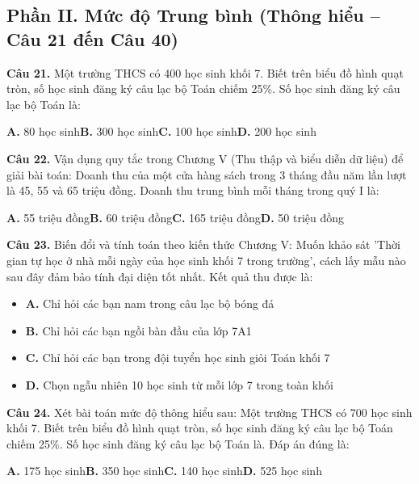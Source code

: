 \documentclass[11pt,a4paper]{article}
\begin{document}
\subsection*{\color{accent} Phần II. Mức độ Trung bình (Thông hiểu -- Câu 21 đến Câu 40)}
\textbf{\color{primary} Câu 21.} Một trường THCS có 400 học sinh khối 7. Biết trên biểu đồ hình quạt tròn, số học sinh đăng ký câu lạc bộ Toán chiếm 25\%. Số học sinh đăng ký câu lạc bộ Toán là:\par
\hspace*{1.5em}\textbf{A.} 80 học sinh\quad\quad \textbf{B.} 300 học sinh\quad\quad \textbf{C.} 100 học sinh\quad\quad \textbf{D.} 200 học sinh\par\vspace{2pt}
\textbf{\color{primary} Câu 22.} Vận dụng quy tắc trong Chương V (Thu thập và biểu diễn dữ liệu) để giải bài toán: Doanh thu của một cửa hàng sách trong 3 tháng đầu năm lần lượt là 45, 55 và 65 triệu đồng. Doanh thu trung bình mỗi tháng trong quý I là:\par
\hspace*{1.5em}\textbf{A.} 55 triệu đồng\quad\quad \textbf{B.} 60 triệu đồng\quad\quad \textbf{C.} 165 triệu đồng\quad\quad \textbf{D.} 50 triệu đồng\par\vspace{2pt}
\textbf{\color{primary} Câu 23.} Biến đổi và tính toán theo kiến thức Chương V: Muốn khảo sát 'Thời gian tự học ở nhà mỗi ngày của học sinh khối 7 trong trường', cách lấy mẫu nào sau đây đảm bảo tính đại diện tốt nhất. Kết quả thu được là:\par
\begin{itemize}\setlength{\itemsep}{1pt}\setlength{\parskip}{0pt}
  \item[] \textbf{A.} Chỉ hỏi các bạn nam trong câu lạc bộ bóng đá
  \item[] \textbf{B.} Chỉ hỏi các bạn ngồi bàn đầu của lớp 7A1
  \item[] \textbf{C.} Chỉ hỏi các bạn trong đội tuyển học sinh giỏi Toán khối 7
  \item[] \textbf{D.} Chọn ngẫu nhiên 10 học sinh từ mỗi lớp 7 trong toàn khối
\end{itemize}\vspace{2pt}
\textbf{\color{primary} Câu 24.} Xét bài toán mức độ thông hiểu sau: Một trường THCS có 700 học sinh khối 7. Biết trên biểu đồ hình quạt tròn, số học sinh đăng ký câu lạc bộ Toán chiếm 25\%. Số học sinh đăng ký câu lạc bộ Toán là. Đáp án đúng là:\par
\hspace*{1.5em}\textbf{A.} 175 học sinh\quad\quad \textbf{B.} 350 học sinh\quad\quad \textbf{C.} 140 học sinh\quad\quad \textbf{D.} 525 học sinh\par\vspace{2pt}
\end{document}
